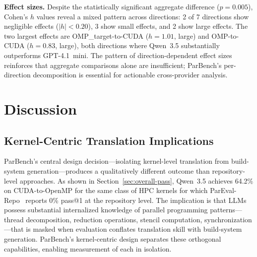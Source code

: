 \documentclass{article}
\begin{document}
\textbf{Effect sizes.}
Despite the statistically significant aggregate difference ($p = 0.005$),
Cohen's $h$ values reveal a mixed pattern across directions: 2 of 7
directions show negligible effects ($|h| < 0.20$), 3 show small effects,
and 2 show large effects. The two largest effects are
OMP\_target-to-CUDA ($h = 1.01$, large) and OMP-to-CUDA ($h = 0.83$,
large), both directions where Qwen~3.5 substantially outperforms
GPT-4.1~mini. The pattern of direction-dependent effect sizes reinforces
that aggregate comparisons alone are insufficient; ParBench's per-direction
decomposition is essential for actionable cross-provider analysis.

\section{Discussion}
\label{sec:discussion}

\subsection{Kernel-Centric Translation Implications}
\label{sec:kernel-advantage}

ParBench's central design decision---isolating kernel-level translation from build-system generation---produces a qualitatively different outcome than repository-level approaches. As shown in Section~\ref{sec:overall-pass}, Qwen~3.5 achieves 64.2\% on CUDA-to-OpenMP for the same class of HPC kernels for which ParEval-Repo~\cite{ParEvalRepo2025} reports 0\% pass@1 at the repository level. The implication is that LLMs possess substantial internalized knowledge of parallel programming patterns---thread decomposition, reduction operations, stencil computation, synchronization---that is masked when evaluation conflates translation skill with build-system generation. ParBench's kernel-centric design separates these orthogonal capabilities, enabling measurement of each in isolation.
\end{document}
